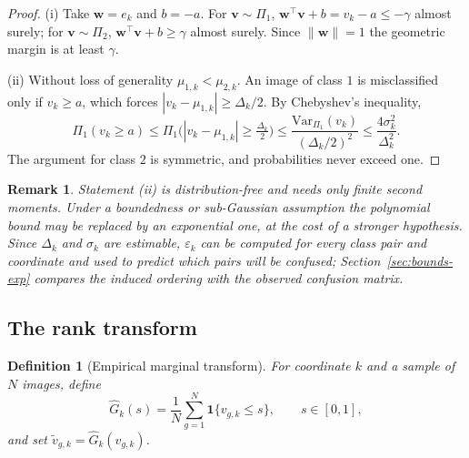 \documentclass[pdflatex,sn-basic]{sn-jnl}
\theoremstyle{thmstyleone}%
\theoremstyle{thmstyletwo}%
\newtheorem{remark}{Remark}%
\theoremstyle{thmstylethree}%
\newtheorem{definition}{Definition}%
\begin{document}
\begin{proof}
(i) Take $\mathbf{w}=e_k$ and $b=-a$. For $\mathbf{v}\sim\Pi_1$,
$\mathbf{w}^{\top}\mathbf{v}+b=v_k-a\le-\gamma$ almost surely; for
$\mathbf{v}\sim\Pi_2$, $\mathbf{w}^{\top}\mathbf{v}+b\ge\gamma$ almost surely.
Since $\|\mathbf{w}\|=1$ the geometric margin is at least $\gamma$.

(ii) Without loss of generality $\mu_{1,k}<\mu_{2,k}$. An image of class $1$ is
misclassified only if $v_k\ge a$, which forces $|v_k-\mu_{1,k}|\ge\Delta_k/2$.
By Chebyshev's inequality,
\begin{equation*}
\Pi_1(v_k\ge a)\le
\Pi_1\Big(|v_k-\mu_{1,k}|\ge\tfrac{\Delta_k}{2}\Big)
\le\frac{\mathrm{Var}_{\Pi_1}(v_k)}{(\Delta_k/2)^{2}}
\le\frac{4\sigma_k^{2}}{\Delta_k^{2}} .
\end{equation*}
The argument for class $2$ is symmetric, and probabilities never exceed one.
\end{proof}

\begin{remark}\label{rem:bound-use}
Statement (ii) is distribution-free and needs only finite second moments. Under
a boundedness or sub-Gaussian assumption the polynomial bound may be replaced
by an exponential one, at the cost of a stronger hypothesis. Since $\Delta_k$
and $\sigma_k$ are estimable, $\varepsilon_k$ can be computed for every class
pair and coordinate and used to predict which pairs will be confused;
Section~\ref{sec:bounds-exp} compares the induced ordering with the observed
confusion matrix.
\end{remark}

\subsection{The rank transform}\label{sec:rank}

\begin{definition}[Empirical marginal transform]\label{def:rank}
For coordinate $k$ and a sample of $N$ images, define
\begin{equation}\label{eq:rank}
\widehat{G}_{k}(s)=\frac{1}{N}\sum_{g=1}^{N}\mathbf{1}\{v_{g,k}\le s\},
\qquad s\in[0,1],
\end{equation}
and set $\widetilde{v}_{g,k}=\widehat{G}_{k}(v_{g,k})$.
\end{definition}
\end{document}
